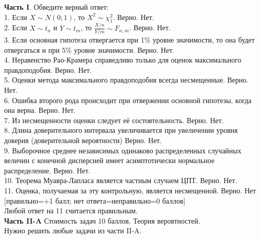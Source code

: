 \documentclass[12pt, a4paper]{article}\usepackage[]{graphicx}\usepackage[]{color}
\begin{document}
\textbf{Часть I}. Обведите верный ответ: \\

1. Если $X\sim N(0;1)$, то $X^{2}\sim \chi^{2}_{1}$. Верно. Нет. \\

2. Если $X\sim t_{n}$ и $Y\sim t_{m}$, то $\frac{X/n}{Y/m}\sim F_{n,m}$. Верно. Нет. \\

3.	Если основная гипотеза отвергается  при 1\% уровне значимости, то она будет отвергаться и при 5\% уровне значимости. Верно. Нет. \\

4.	Неравенство Рао-Крамера справедливо только для оценок максимального правдоподобия. Верно. Нет. \\

5.	Оценки метода максимального правдоподобия всегда несмещенные. Верно. Нет. \\

6.	Ошибка второго рода происходит при отвержении основной гипотезы, когда она верна. Верно. Нет. \\

7.	Из несмещенности оценки следует её состоятельность. Верно. Нет. \\

8.	Длина доверительного интервала увеличивается при увеличении уровня доверия (доверительной вероятности) Верно. Нет. \\

9.	Выборочное среднее независимых одинаково распределенных случайных величин с конечной дисперсией имеет асимптотически нормальное распределение. Верно. Нет. \\

10.	Теорема Муавра-Лапласа  является частным случаем ЦПТ. Верно. Нет. \\

11.	 Оценка, получаемая за эту контрольную, является несмещенной. Верно. Нет\\


$[$правильно=+1 балл; нет ответа=неправильно=0 баллов$]$ \\
Любой ответ на 11 считается правильным. \\


\textbf{Часть II-A} Стоимость задач 10 баллов. Теория вероятностей. \\

Нужно решить любые \textbf{} задачи из части II-A. \\
\end{document}
